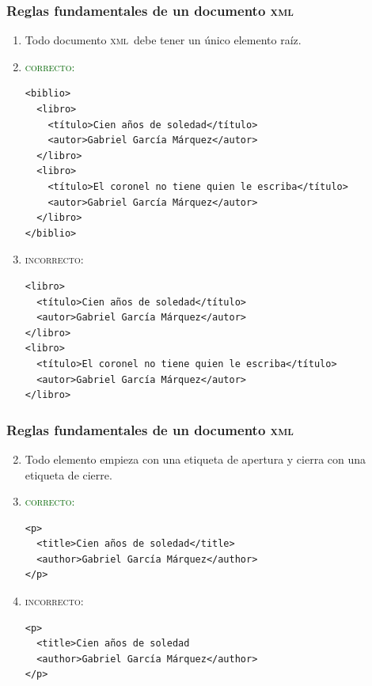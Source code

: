 \documentclass[%
  handout, %
  xcolor=svgnames]{beamer}
\newcommand*{\rojo}[1]{\textcolor[HTML]{8B0000}{#1}}
\newcommand*{\verde}[1]{\textcolor{DarkGreen}{#1}}
\newcommand*{\XML}{\textsc{xml}}
\begin{document}
\begin{frame}[fragile]
  \frametitle{Reglas fundamentales de un documento \XML}
  \begin{enumerate}
    \item Todo documento \XML\ debe tener un único elemento raíz.
    \item[] \verde{\textsc{correcto}:}
\begin{verbatim}
<biblio>
  <libro>
    <título>Cien años de soledad</título>
    <autor>Gabriel García Márquez</autor>
  </libro>
  <libro>
    <título>El coronel no tiene quien le escriba</título>
    <autor>Gabriel García Márquez</autor>
  </libro>
</biblio>
\end{verbatim}

    \item[] \rojo{\textsc{incorrecto}:}
\begin{verbatim}
<libro>
  <título>Cien años de soledad</título>
  <autor>Gabriel García Márquez</autor>
</libro>
<libro>
  <título>El coronel no tiene quien le escriba</título>
  <autor>Gabriel García Márquez</autor>
</libro>
\end{verbatim}
  \end{enumerate}
\end{frame}



\begin{frame}[fragile]
  \frametitle{Reglas fundamentales de un documento \XML}
  \begin{enumerate}
      \setcounter{enumi}{1}  
    \item Todo elemento empieza con una etiqueta de apertura y cierra con una etiqueta de cierre.

    \item[] \verde{\textsc{correcto}:}
\begin{verbatim}
<p>
  <title>Cien años de soledad</title>
  <author>Gabriel García Márquez</author>
</p>
\end{verbatim}

    \item[] \rojo{\textsc{incorrecto}:}
\begin{verbatim}
<p>
  <title>Cien años de soledad
  <author>Gabriel García Márquez</author>
</p>
\end{verbatim}
      
  \end{enumerate}
\end{frame}
\end{document}

